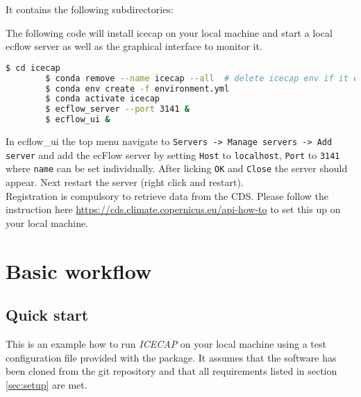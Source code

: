 \documentclass[DIV=10, parskip=full]{scrreprt}
\newcommand{\ice}{\textit{ICECAP}\xspace}
\begin{document}
\clearpage


It contains the following subdirectories:




The following code will install icecap on your local machine and start a local ecflow server as well as the graphical interface to monitor it.\\
	
	\begin{lstlisting}[language=bash, float]
		$ cd icecap
		$ conda remove --name icecap --all  # delete icecap env if it exists
		$ conda env create -f environment.yml 
		$ conda activate icecap
		$ ecflow_server --port 3141 &
		$ ecflow_ui & 
	\end{lstlisting}
	In ecflow\_ui the top menu navigate to \texttt{Servers -> Manage servers -> Add server} and add the ecFlow server by setting \texttt{Host} to \texttt{localhost}, \texttt{Port} to \texttt{3141} where \texttt{name} can be set individually. After licking \texttt{OK} and \texttt{Close} the server should appear. Next restart the server (right click and restart).\\
	
	Registration is compulsory to retrieve data from the CDS. Please follow the instruction here \url{https://cds.climate.copernicus.eu/api-how-to} to set this up on your local machine.


\chapter{Basic workflow}
\section{Quick start} \label{sec:quick_start}
This is an example how to run \ice on your local machine using a test configuration file provided with the package. It assumes that the software has been cloned from the git repository and that all requirements listed in section \ref{sec:setup} are met.
\end{document}
